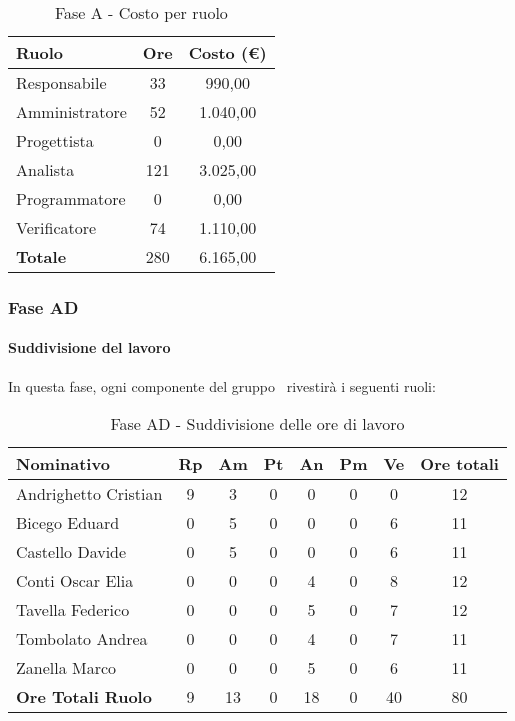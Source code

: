 \documentclass[../PianoProgetto.tex]{subfiles}
\begin{document}
	\begin{table}[h]
		\centering
		\begin{tabular}{l * {2}{c}}
			\toprule
			\textbf{Ruolo} & \textbf{Ore} & \textbf{Costo (\euro{})} \\
			\midrule
			Responsabile &	33 &  990,00 \\
			Amministratore & 52 &  1.040,00 \\
			Progettista & 0 & 0,00 \\
			Analista & 121 & 3.025,00 \\
			Programmatore & 0 & 0,00 \\
			Verificatore & 74 & 1.110,00 \\
			\midrule		
			\textbf{Totale} & 280 & 6.165,00 \\
			\bottomrule	
		\end{tabular}
		
		\caption{Fase A - Costo per ruolo}
		\label{tab:faseA_costo}
		
	\end{table}
\newpage	
	\subsubsection{Fase AD}
				\paragraph{Suddivisione del lavoro}
					In questa fase, ogni componente del gruppo \leaf\ rivestirà i seguenti ruoli:
	
	\begin{table}[h]
		\begin{tabularx}{\textwidth}{l  * {6}{C}  c}
			\toprule
			\textbf{Nominativo} & \textbf{Rp} & \textbf{Am} & \textbf{Pt} 
						& \textbf{An} & \textbf{Pm} & \textbf{Ve} & \textbf{Ore totali} \\
			\midrule
			Andrighetto Cristian & 9 & 3 &	0 &	0 & 0 & 0 & 12 \\
			Bicego Eduard & 0 & 5 & 0 & 0 & 0 & 6 & 11 \\
			Castello Davide & 0 & 5 & 0 & 0 & 0 & 6 & 11 \\
			Conti Oscar Elia & 0 & 0 &	0 &	4 & 0 & 8 & 12 \\
			Tavella Federico &	0 & 0 & 0 & 5 & 0 & 7 & 12 \\
			Tombolato Andrea & 0 & 0 &	0 &	4 & 0 & 7 & 11 \\
			Zanella Marco & 0 & 0 & 0 & 5 & 0 & 6 & 11 \\
			\midrule			
			\textbf{Ore Totali Ruolo} & 9 & 13 & 0 & 18 & 0 & 40 & 80 \\
			\bottomrule
		\end{tabularx}
		
		\caption{Fase AD - Suddivisione delle ore di lavoro}
		\label{tab:faseAD_ore}
		
	\end{table}
\end{document}
